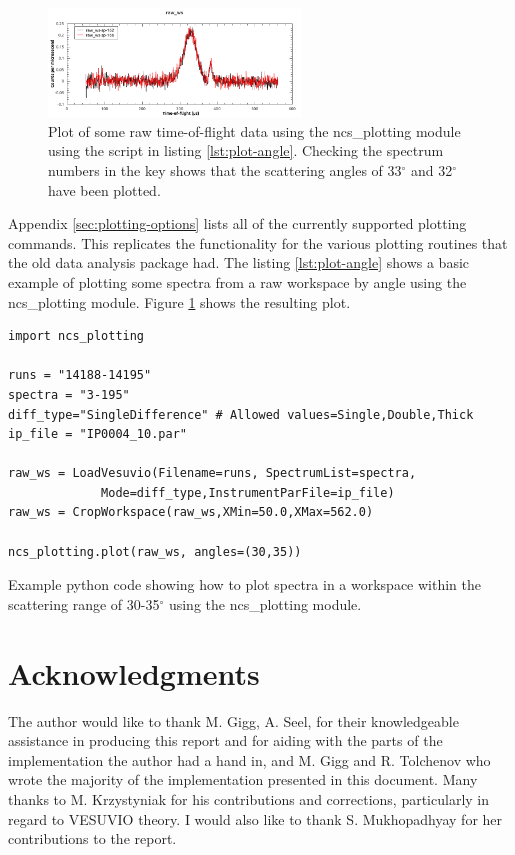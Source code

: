 \documentclass[paper=a4, fontsize=11pt]{scrartcl}	%
\numberwithin{equation}{section}															%
\numberwithin{figure}{section}																%
\numberwithin{table}{section}
\begin{document}
\begin{figure}[H]
\centering
\includegraphics[width=0.6\textwidth]{img/plot-angle.png}
\caption{Plot of some raw time-of-flight data using the ncs\_plotting module using the script in listing \ref{lst:plot-angle}. Checking the spectrum numbers in the key shows that the scattering angles of 33$^\circ$ and 32$^\circ$ have been plotted.}
\label{fig:plot-angle}
\end{figure}

Appendix \ref{sec:plotting-options} lists all of the currently supported plotting commands. This replicates the functionality for the various plotting routines that the old data analysis package had. The listing \ref{lst:plot-angle} shows a basic example of plotting some spectra from a raw workspace by angle using the ncs\_plotting module. Figure \ref{fig:plot-angle} shows the resulting plot.

\begin{listing}[H]
\begin{verbatim}
import ncs_plotting

runs = "14188-14195"
spectra = "3-195"
diff_type="SingleDifference" # Allowed values=Single,Double,Thick
ip_file = "IP0004_10.par"

raw_ws = LoadVesuvio(Filename=runs, SpectrumList=spectra,
		     Mode=diff_type,InstrumentParFile=ip_file)
raw_ws = CropWorkspace(raw_ws,XMin=50.0,XMax=562.0)

ncs_plotting.plot(raw_ws, angles=(30,35))
\end{verbatim}
\caption{Example python code showing how to plot spectra in a workspace within the scattering range of 30-35$^\circ$ using the ncs\_plotting module.}
\label{lst:plot-angle}
\end{listing}

\clearpage
\section*{Acknowledgments}
The author would like to thank M. Gigg, A. Seel, for their knowledgeable assistance in producing this report and for aiding with the parts of the implementation the author had a hand in, and M. Gigg and R. Tolchenov who wrote the majority of the implementation presented in this document. Many thanks to M. Krzystyniak for his contributions and  corrections, particularly in regard to VESUVIO theory. I would also like to thank S. Mukhopadhyay for her contributions to the report.
\end{document}

